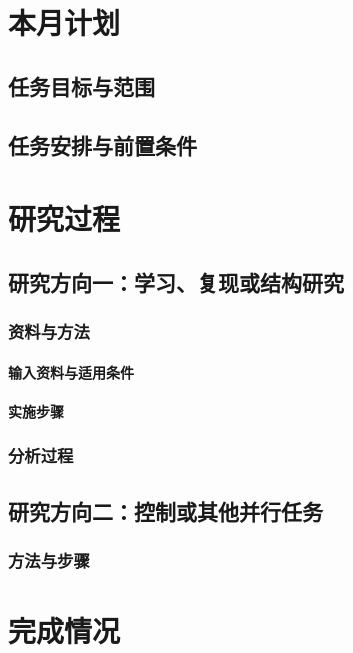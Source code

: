 \documentclass[stage1]{ydzjreport}
\begin{document}
\makestageonehead

\section{本月计划}
\subsection{任务目标与范围}
\subsection{任务安排与前置条件}

\section{研究过程}
\subsection{研究方向一：学习、复现或结构研究}
\subsubsection{资料与方法}
\paragraph{输入资料与适用条件}
\paragraph{实施步骤}
\subsubsection{分析过程}
\subsection{研究方向二：控制或其他并行任务}
\subsubsection{方法与步骤}

\section{完成情况}
\end{document}
